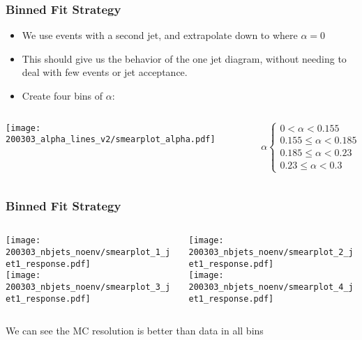 \documentclass{beamer}
\begin{document}
\begin{frame}
  \frametitle{Binned Fit Strategy}

  \begin{itemize}
  \item We use events with a second jet, and extrapolate down to where $\alpha = 0$
  \item This should give us the behavior of the one jet diagram,
    without needing to deal with few events or jet acceptance.
  \item Create four bins of $\alpha$:
  \end{itemize}
  \begin{columns}
    \begin{column}{0.5\linewidth}
      \texttt{[image: 200303\_alpha\_lines\_v2/smearplot\_alpha.pdf]}
    \end{column}
    \begin{column}{0.5\linewidth}
      \[
      \alpha
      \begin{cases}
        0 < \alpha < 0.155 \\
        0.155 \le \alpha < 0.185 \\
        0.185 \le \alpha < 0.23 \\
        0.23 \le \alpha < 0.3
      \end{cases}
      \]
    \end{column}
  \end{columns}

\end{frame}


\begin{frame}
  \frametitle{Binned Fit Strategy}

  \begin{columns}
    \begin{column}{0.3\linewidth}
      \centering
      \texttt{[image: 200303\_nbjets\_noenv/smearplot\_1\_jet1\_response.pdf]} \\
      \texttt{[image: 200303\_nbjets\_noenv/smearplot\_3\_jet1\_response.pdf]}
    \end{column}
    \begin{column}{0.3\linewidth}
      \centering
      \texttt{[image: 200303\_nbjets\_noenv/smearplot\_2\_jet1\_response.pdf]} \\
      \texttt{[image: 200303\_nbjets\_noenv/smearplot\_4\_jet1\_response.pdf]}
    \end{column}
  \end{columns}

  \vfill
  We can see the MC resolution is better than data in all bins

\end{frame}
\end{document}

